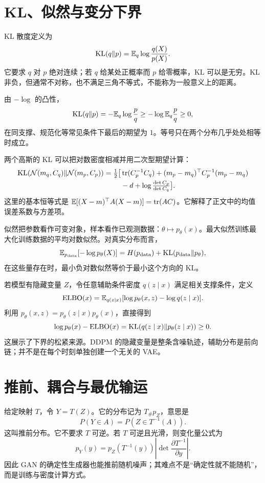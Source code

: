 \section{KL、似然与变分下界}
KL 散度定义为
\begin{equation}
 \operatorname{KL}(q\Vert p)=\mathbb{E}_q\log\frac{q(X)}{p(X)}.
\end{equation}
它要求 $q$ 对 $p$ 绝对连续；若 $q$ 给某处正概率而 $p$ 给零概率，KL 可以是无穷。KL 非负，但通常不对称，也不满足三角不等式，不能称为一般意义上的距离。

由 $-\log$ 的凸性，
\begin{equation}
 \operatorname{KL}(q\Vert p)=-\mathbb{E}_q\log\frac pq
 \ge-\log\mathbb{E}_q\frac pq\ge0,
\end{equation}
在同支撑、规范化等常见条件下最后的期望为 $1$。等号只在两个分布几乎处处相等时成立。

两个高斯的 KL 可以把对数密度相减并用二次型期望计算：
\begin{align}
 \operatorname{KL}(\mathcal{N}(m_q,C_q)\Vert\mathcal{N}(m_p,C_p))
 =\tfrac12\bigl[&\operatorname{tr}(C_p^{-1}C_q)
 +(m_p-m_q)^\top C_p^{-1}(m_p-m_q)\\
 &-d+\log\tfrac{\det C_p}{\det C_q}\bigr].
\end{align}
这里的基本恒等式是 $\mathbb{E}[(X-m)^\top A(X-m)]=\operatorname{tr}(AC)$。它解释了正文中的均值误差系数与方差项。

似然把参数看作可变对象，样本看作已观测数据：$\theta\mapsto p_\theta(x)$。最大似然训练最大化训练数据的平均对数似然。对真实分布而言，
\begin{equation}
 \mathbb{E}_{p_{\mathrm{data}}}[-\log p_\theta(X)]
 =H(p_{\mathrm{data}})+\operatorname{KL}(p_{\mathrm{data}}\Vert p_\theta),
\end{equation}
在这些量存在时，最小负对数似然等价于最小这个方向的 KL。

若模型有隐藏变量 $Z$，令任意辅助条件密度 $q(z\mid x)$ 满足相关支撑条件，定义
\begin{equation}
 \mathrm{ELBO}(x)=\mathbb{E}_{q(z\mid x)}[\log p_\theta(x,z)-\log q(z\mid x)].
\end{equation}
利用 $p_\theta(x,z)=p_\theta(z\mid x)p_\theta(x)$，直接得到
\begin{equation}
 \log p_\theta(x)-\mathrm{ELBO}(x)
 =\operatorname{KL}(q(z\mid x)\Vert p_\theta(z\mid x))\ge0.
\end{equation}
这展示了下界的松紧来源。DDPM 的隐藏变量是整条含噪轨迹，辅助分布是前向链；并不是在每个时刻单独创建一个无关的 VAE。

\section{推前、耦合与最优输运}
给定映射 $T$，令 $Y=T(Z)$。它的分布记为 $T_\#p_Z$，意思是
\begin{equation}
 P(Y\in A)=P(Z\in T^{-1}(A)).
\end{equation}
这叫推前分布。它不要求 $T$ 可逆。若 $T$ 可逆且光滑，则变化量公式为
\begin{equation}
 p_Y(y)=p_Z(T^{-1}(y))\left|\det\frac{\partial T^{-1}}{\partial y}\right|.
\end{equation}
因此 GAN 的确定性生成器也能推前随机噪声；其难点不是“确定性就不能随机”，而是训练与密度计算方式。


